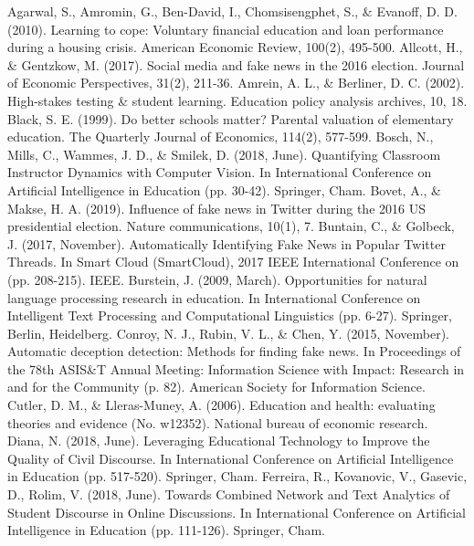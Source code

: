 \documentclass[12pt, final]{article}
\begin{document}
  \begin{thebibliography}{1}
   Agarwal, S., Amromin, G., Ben-David, I., Chomsisengphet, S., \& Evanoff, D. D. (2010). Learning to cope: Voluntary financial education and loan performance during a housing crisis. American Economic Review, 100(2), 495-500.
   Allcott, H., \& Gentzkow, M. (2017). Social media and fake news in the 2016 election. Journal of Economic Perspectives, 31(2), 211-36.
   Amrein, A. L., \& Berliner, D. C. (2002). High-stakes testing \& student learning. Education policy analysis archives, 10, 18.
   Black, S. E. (1999). Do better schools matter? Parental valuation of elementary education. The Quarterly Journal of Economics, 114(2), 577-599.
   Bosch, N., Mills, C., Wammes, J. D., \& Smilek, D. (2018, June). Quantifying Classroom Instructor Dynamics with Computer Vision. In International Conference on Artificial Intelligence in Education (pp. 30-42). Springer, Cham.
   Bovet, A., \& Makse, H. A. (2019). Influence of fake news in Twitter during the 2016 US presidential election. Nature communications, 10(1), 7.
   Buntain, C., \& Golbeck, J. (2017, November). Automatically Identifying Fake News in Popular Twitter Threads. In Smart Cloud (SmartCloud), 2017 IEEE International Conference on (pp. 208-215). IEEE.
   Burstein, J. (2009, March). Opportunities for natural language processing research in education. In International Conference on Intelligent Text Processing and Computational Linguistics (pp. 6-27). Springer, Berlin, Heidelberg.
   Conroy, N. J., Rubin, V. L., \& Chen, Y. (2015, November). Automatic deception detection: Methods for finding fake news. In Proceedings of the 78th ASIS\&T Annual Meeting: Information Science with Impact: Research in and for the Community (p. 82). American Society for Information Science.
   Cutler, D. M., \& Lleras-Muney, A. (2006). Education and health: evaluating theories and evidence (No. w12352). National bureau of economic research.
    Diana, N. (2018, June). Leveraging Educational Technology to Improve the Quality of Civil Discourse. In International Conference on Artificial Intelligence in Education (pp. 517-520). Springer, Cham.
    Ferreira, R., Kovanovic, V., Gasevic, D., Rolim, V. (2018, June). Towards Combined Network and Text Analytics of Student Discourse in Online Discussions. In International Conference on Artificial Intelligence in Education (pp. 111-126). Springer, Cham.

\end{thebibliography}
\end{document}
